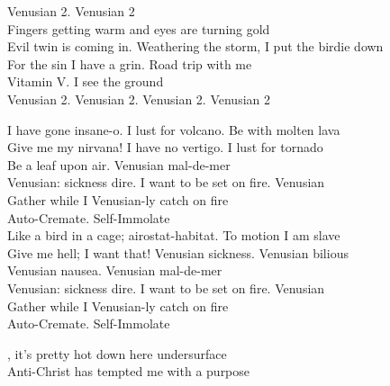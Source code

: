 Venusian 2. Venusian 2 \\

Fingers getting warm and eyes are turning gold \\
Evil twin is coming in. Weathering the storm, I put the birdie down \\
For the sin I have a grin. Road trip with me \\
Vitamin V. I see the ground \\

Venusian 2. Venusian 2. Venusian 2. Venusian 2 \\




I have gone insane-o. I lust for volcano. Be with molten lava \\
Give me my nirvana! I have no vertigo. I lust for tornado \\
Be a leaf upon air. Venusian mal-de-mer \\

Venusian: sickness dire. I want to be set on fire. Venusian \\
Gather while I Venusian-ly catch on fire \\

Auto-Cremate. Self-Immolate \\

Like a bird in a cage; airostat-habitat. To motion I am slave \\
Give me hell; I want that! Venusian sickness. Venusian bilious \\
Venusian nausea. Venusian mal-de-mer \\

Venusian: sickness dire. I want to be set on fire. Venusian \\
Gather while I Venusian-ly catch on fire \\

Auto-Cremate. Self-Immolate \\




, it's pretty hot down here undersurface \\
Anti-Christ has tempted me with a purpose \\


